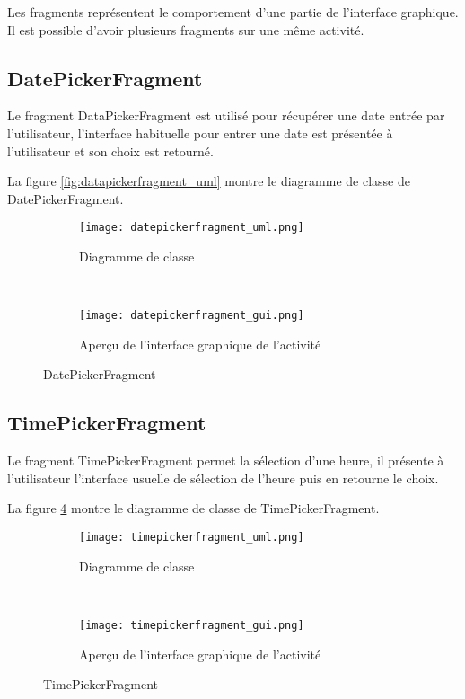 Les fragments représentent le comportement d'une partie de l'interface graphique. Il est possible d'avoir plusieurs fragments sur une même activité.

\subsection{DatePickerFragment}

Le fragment DataPickerFragment est utilisé pour récupérer une date entrée par l'utilisateur, l'interface habituelle pour entrer une date est présentée à l'utilisateur et son choix est retourné.

La figure \ref{fig:datapickerfragment_uml} montre le diagramme de classe de DatePickerFragment.

\begin{figure}[htb!]
    \centering
    \begin{subfigure}[htb]{0.49\textwidth}
		\texttt{[image: datepickerfragment\_uml.png]} 
		\caption{Diagramme de classe}
		\label{fig:datepickerfragment_uml}
    \end{subfigure}
    ~ %
    \begin{subfigure}[htb]{0.49\textwidth}
		\texttt{[image: datepickerfragment\_gui.png]} 
		\caption{Aperçu de l'interface graphique de l'activité}
		\label{fig:datepickerfragment_gui}
    \end{subfigure}
    \caption{DatePickerFragment}\label{fig:datepickerfragment_fig}
\end{figure}

\subsection{TimePickerFragment}

Le fragment TimePickerFragment permet la sélection d'une heure, il présente à l'utilisateur l'interface usuelle de sélection de l'heure puis en retourne le choix.

La figure \ref{fig:timepickerfragment_uml} montre le diagramme de classe de TimePickerFragment.

\begin{figure}[htb!]
    \centering
    \begin{subfigure}[htb]{0.49\textwidth}
		\texttt{[image: timepickerfragment\_uml.png]} 
		\caption{Diagramme de classe}
		\label{fig:timepickerfragment_uml}
    \end{subfigure}
    ~ %
    \begin{subfigure}[htb]{0.49\textwidth}
		\texttt{[image: timepickerfragment\_gui.png]} 
		\caption{Aperçu de l'interface graphique de l'activité}
		\label{fig:timepickerfragment_gui}
    \end{subfigure}
    \caption{TimePickerFragment}\label{fig:timepickerfragment_fig}
\end{figure}

